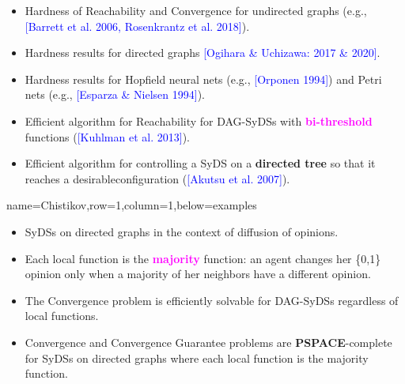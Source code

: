 \documentclass[landscape,a0paper,fontscale=0.285]{baposter} %
\newcommand{\compresslist}{ %
\setlength{\itemsep}{1pt}
\setlength{\parskip}{0pt}
\setlength{\parsep}{0pt}
}
\newcommand{\cpsp}{\mbox{\textbf{PSPACE}}}
\begin{document}
\begin{poster}
{\begin{itemize}[leftmargin=*,noitemsep,topsep=0pt]
\compresslist
\item Hardness of Reachability and 
Convergence for undirected graphs
(e.g., \textcolor{blue}{[Barrett et al. 2006, Rosenkrantz et al. 2018]}).
\item Hardness results for directed graphs 
\textcolor{blue}{[Ogihara \& Uchizawa: 2017 \& 2020]}. %
\item Hardness results for Hopfield neural nets (e.g., 
         \textcolor{blue}{[Orponen 1994]}) and Petri nets 
         (e.g., \textcolor{blue}{[Esparza \& Nielsen 1994]}).
\item Efficient algorithm for Reachability for DAG-SyDSs with 
\textcolor{magenta}{\textbf{bi-threshold}} functions
(\textcolor{blue}{[Kuhlman et al. 2013]}).
\item Efficient algorithm for  controlling a SyDS 
on a \textcolor{dgreen}{\textbf{directed tree}}
so that it reaches a desirable\newline configuration 
(\textcolor{blue}{[Akutsu et al. 2007]}).
\end{itemize}
}


          {name=Chistikov,row=1,column=1,below=examples}{
{\small
\begin{itemize}[leftmargin=*,noitemsep,topsep=0pt]
\compresslist
\item SyDSs on directed graphs in the context of diffusion
of opinions. \smallskip
\item Each local function is the \textcolor{magenta}{\textbf{majority}}
function: an agent changes her \{0,1\} opinion only when a majority
of her neighbors have a different opinion.\smallskip
\item The Convergence problem is efficiently solvable for DAG-SyDSs
regardless of local functions. \smallskip
\item Convergence and Convergence Guarantee problems are
\cpsp-complete for SyDSs on directed graphs where each local
function is the majority function. %
\end{itemize}
}
}



\end{poster}
\end{document}
